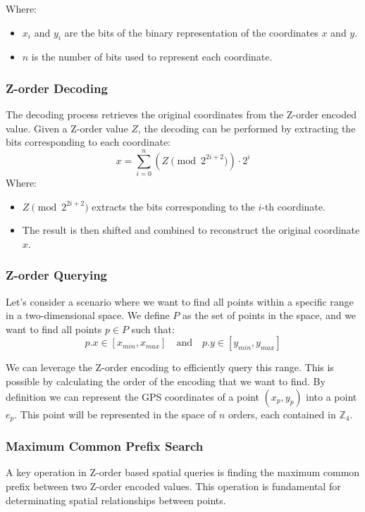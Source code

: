 Where:
\begin{itemize}
    \item \( x_i \) and \( y_i \) are the bits of the binary representation of the coordinates \( x \) and \( y \).
    \item \( n \) is the number of bits used to represent each coordinate.
\end{itemize}

\subsubsection{Z-order Decoding}
The decoding process retrieves the original coordinates from the Z-order encoded value. Given a Z-order value \( Z \), the decoding can be performed by extracting the bits corresponding to each coordinate:
\[
    x = \sum_{i=0}^{n} (Z \pmod{ 2^{2i+2} }) \cdot 2^i
\]
Where:
\begin{itemize}
    \item \( Z \pmod{ 2^{2i+2} } \) extracts the bits corresponding to the \( i \)-th coordinate.
    \item The result is then shifted and combined to reconstruct the original coordinate \( x \).
\end{itemize}

\subsubsection{Z-order Querying}
Let's consider a scenario where we want to find all points within a specific range in a two-dimensional space. We define \( P \) as the set of points in the space, and we want to find all points \( p \in P \) such that:
\[
    p.x \in [x_{min}, x_{max}] \quad \text{and} \quad p.y \in [y_{min}, y_{max}]
\]

We can leverage the Z-order encoding to efficiently query this range. This is possible by calculating the order of the encoding that we want to find. 
By definition we can represent the GPS coordinates of a point \( (x_p, y_p) \) into a point \( e_p \). This point will be represented in the space of \( n \) orders, each contained in \( \mathbb{Z}_4 \).

\subsubsection{Maximum Common Prefix Search}
A key operation in Z-order based spatial queries is finding the maximum common prefix between two Z-order encoded values. This operation is fundamental for determinating spatial relationships between points.

